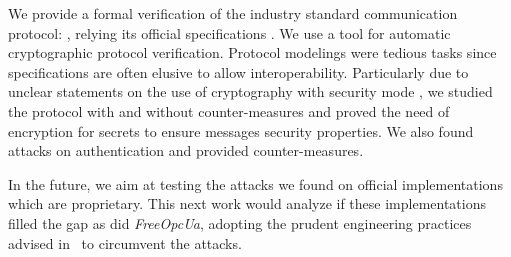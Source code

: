 We provide a formal verification of the industry standard
communication protocol: \opcua, relying its official specifications
\cite{MLD09,opcua_part2,opcua_part4,opcua_part6}.
We use \proverif{} a tool for automatic cryptographic protocol
verification.  Protocol modelings were tedious tasks since
specifications are often elusive to allow interoperability.
Particularly due to unclear statements on the use of cryptography with
security mode \sms, we studied the protocol with and without
counter-measures and proved the need of encryption for secrets to
ensure messages security properties.  We also found attacks on
authentication and provided counter-measures.

In the future, we aim at testing the attacks we found on official
implementations which are proprietary. This next work would analyze
if these implementations filled the gap as did {\em FreeOpcUa}, 
adopting the prudent engineering practices advised in~\cite{AN96} to
circumvent the attacks.
